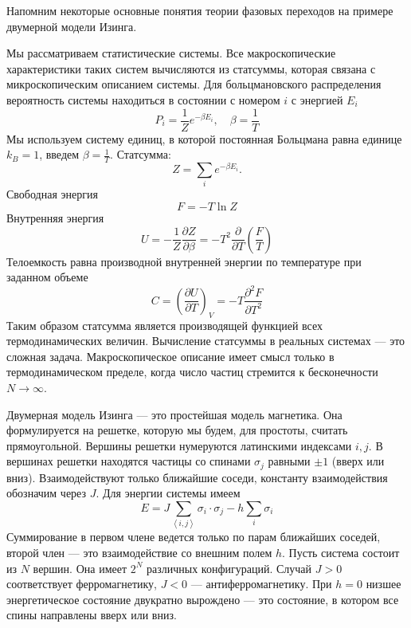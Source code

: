 \documentclass[a4paper,12pt]{article}
\theoremstyle{definition}
\theoremstyle{definition}
\theoremstyle{definition}
\begin{document}
Напомним некоторые основные понятия теории фазовых переходов на примере двумерной модели Изинга.

Мы рассматриваем статистические системы. Все макроскопические характеристики таких систем
вычисляются из статсуммы, которая связана с микроскопическим описанием системы. Для больцмановского
распределения вероятность системы находиться в состоянии с номером $i$ с энергией $E_i$
\begin{equation}
  \label{eq:2}
  P_i=\frac{1}{Z}e^{-\beta E_i}, \quad \beta=\frac{1}{T}
\end{equation}
Мы используем систему единиц, в которой постоянная Больцмана равна единице $k_B=1$, введем
$\beta=\frac{1}{T}$. Статсумма:
\begin{equation}
  \label{eq:3}
  Z=\sum_i e^{-\beta E_i}.
\end{equation}
Свободная энергия
\begin{equation}
  \label{eq:4}
  F=-T\ln Z
\end{equation}
Внутренняя энергия
\begin{equation}
  \label{eq:5}
  U=-\frac{1}{Z}\frac{\partial Z}{\partial \beta}=-T^2 \frac{\partial}{\partial T}\left(\frac{F}{T}\right)
\end{equation}
Телоемкость равна производной внутренней энергии по температуре при заданном объеме
\begin{equation}
  \label{eq:6}
  C=\left(\frac{\partial U}{\partial T}\right)_V=-T\frac{\partial^2 F}{\partial T^2}
\end{equation}
Таким образом статсумма является производящей функцией всех термодинамических величин. Вычисление
статсуммы в реальных системах --- это сложная задача. Макроскопическое описание имеет смысл только в
термодинамическом пределе, когда число частиц стремится к бесконечности $N\to \infty$.

Двумерная модель Изинга --- это простейшая модель магнетика. Она формулируется на решетке, которую
мы будем, для простоты, считать прямоугольной. Вершины решетки нумеруются латинскими индексами
$i,j$. В вершинах решетки находятся частицы со спинами $\sigma_j$ равными $\pm 1$ (вверх или вниз).
Взаимодействуют только ближайшие соседи, константу взаимодействия обозначим через $J$. Для энергии
системы имеем
\begin{equation}
  \label{eq:1}
  E=J\sum_{\left<i,j\right>} \sigma_i\cdot \sigma_j-h\sum_i \sigma_i
\end{equation}
Суммирование в первом члене ведется только по парам ближайших соседей, второй член --- это
взаимодействие со внешним полем $h$. Пусть система состоит из $N$ вершин. Она имеет $2^N$ различных
конфигураций. Случай $J>0$ соответствует ферромагнетику, $J<0$ --- антиферромагнетику. При $h=0$
низшее энергетическое состояние двукратно вырождено --- это состояние, в котором все спины
направлены вверх или вниз.
\end{document}
